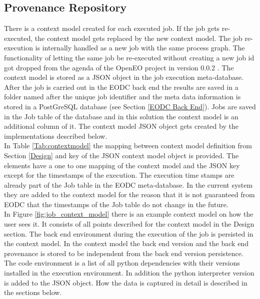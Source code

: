 \documentclass[draft,final]{vutinfth} %
\begin{document}
\subsection{Provenance Repository}\label{Implementation:Provenance Repository}
There is a context model created for each executed job. If the job gets re-executed, the context model gets replaced by the new context model. The job re-execution is internally handled as a new job with the same process graph. The functionality of letting the same job be re-executed without creating a new job id got dropped from the agenda of the OpenEO project in version 0.0.2 \cite{openeo_api_desc}. 
The context model is stored as a JSON object in the job execution meta-database. After the job is carried out in the EODC back end the results are saved in a folder named after the unique job identifier and the meta data information is stored in a PostGreSQL database (see Section \ref{EODC Back End}). Jobs are saved in the Job table of the database and in this solution the context model is an additional column of it. The context model JSON object gets created by the implementations described below. \\
In Table \ref{Tab:contextmodel} the mapping between context model definition from Section \ref{Design} and key of the JSON context model object is provided. The elements have a one to one mapping of the context model and the JSON key except for the timestamps of the execution. The execution time stamps are already part of the Job table in the EODC meta-database. In the current system they are added to the context model for the reason that it is not guaranteed from EODC that the timestamps of the Job table do not change in the future.\\
In Figure \ref{fig:job_context_model} there is an example context model on how the user sees it. It consists of all points described for the context model in the Design section. The back end environment during the execution of the job is persisted in the context model. In the context model the back end version and the back end provenance is stored to be independent from the back end version persistence. The code environment is a list of all python dependencies with their versions installed in the execution environment. In addition the python interpreter version is added to the JSON object. How the data is captured in detail is described in the sections below.    
 
 
 
\end{document}
